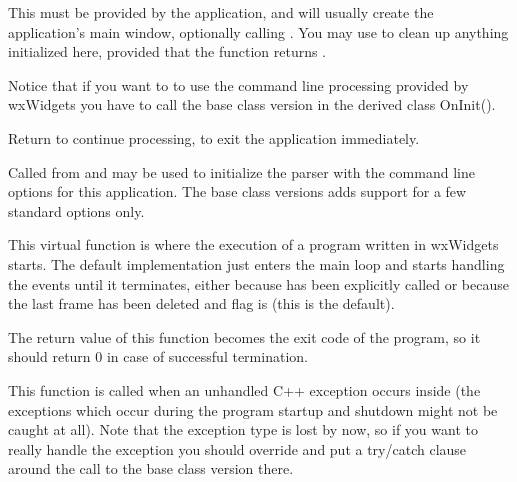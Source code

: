 \label{wxapponinit}


This must be provided by the application, and will usually create the
application's main window, optionally calling 
. You may use 
 to clean up anything initialized here, provided
that the function returns \true.

Notice that if you want to to use the command line processing provided by
wxWidgets you have to call the base class version in the derived class
OnInit().

Return \true to continue processing, \false to exit the application
immediately.


\label{wxapponinitcmdline}


Called from  and may be used to initialize the
parser with the command line options for this application. The base class
versions adds support for a few standard options only.

\label{wxapponrun}


This virtual function is where the execution of a program written in wxWidgets
starts. The default implementation just enters the main loop and starts
handling the events until it terminates, either because 
 has been explicitly called or because
the last frame has been deleted and 
 flag is \true (this
is the default).

The return value of this function becomes the exit code of the program, so it
should return $0$ in case of successful termination.


\label{wxapponunhandledexception}


This function is called when an unhandled C++ exception occurs inside 
 (the exceptions which occur during the program
startup and shutdown might not be caught at all).
Note that the exception type is lost by now, so if you want to really handle
the exception you should override  and put a
try/catch clause around the call to the base class version there.


